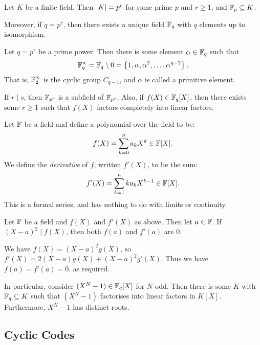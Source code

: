 \documentclass{article}
\begin{document}
\begin{theorem}
    Let $K$ be a finite field. Then $\left\lvert K \right\rvert = p^r$ for some prime $p$ and $r \geq 1$, and $\mathbb{F}_p \subseteq K$.
    
    Moreover, if $q = p^r$, then there exists a unique field $\mathbb{F}_q$ with $q$ elements up to isomorphism.
\end{theorem}

\begin{proposition}[Isomorphism]
    Let $q = p^r$ be a prime power. Then there is some element $\alpha \in \mathbb{F}_q$ such that
    \[
    \mathbb{F}_q^\times = \mathbb{F}_q \setminus 0 = \left\lbrace 1, \alpha, \alpha^2, \dots, \alpha^{q-2} \right\rbrace.
    \]
    That is, $\mathbb{F}_2^\times$ is the cyclic group $C_{q-1}$, and $\alpha$ is called a primitive element.
    
    If $r \mid s$, then $\mathbb{F}_{p^r}$ is a subfield of $\mathbb{F}_{p^s}$. Also, if $f(X) \in \mathbb{F}_q[X]$, then there exists some $r \geq 1$ such that $f(X)$ factors completely into linear factors.
\end{proposition}

\begin{definition}[Derivative]
    Let $\mathbb{F}$ be a field and define a polynomial over the field to be:
    \[
	f(X) = \sum_{k=0}^n a_k X^k \in \mathbb{F}[X].
	\]
	We define the \textit{derivative} of $f$, written $f'(X)$, to be the sum:
	\[
	f'(X) = \sum_{k=1}^n ka_k X^{k-1} \in \mathbb{F}[X].
	\]
	This is a formal series, and has nothing to do with limits or continuity.
\end{definition}

\begin{proposition}[Differentiation]
    Let $\mathbb{F}$ be a field and $f(X)$ and $f'(X)$ as above. Then let $a \in \mathbb{F}$. If $(X-a)^2 \mid f(X)$, then both $f(a)$ and $f'(a)$ are 0.
\end{proposition}

\begin{prf}
    We have $f(X) = (X-a)^2 g(X)$, so $f'(X) = 2(X-a)g(X) + (X-a)^2g'(X)$. Thus we have $f(a) = f'(a) = 0$, as required.
\end{prf}

In particular, consider $(X^N - 1) \in \mathbb{F}_q[X]$ for $N$ odd. Then there is some $K$ with $\mathbb{F}_q \subseteq K$ such that $(X^N-1)$ factorises into linear factors in $K[X]$. Furthermore, $X^N-1$ has distinct roots.


\subsection{Cyclic Codes}
\end{document}

